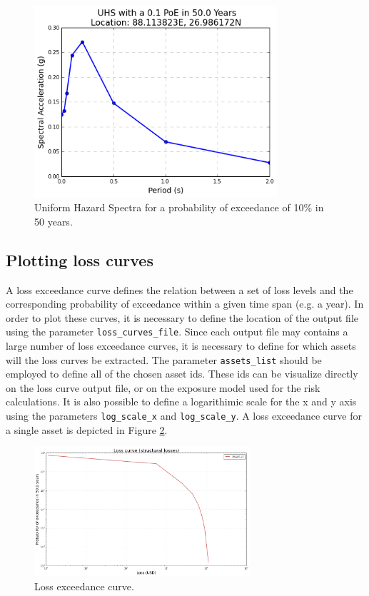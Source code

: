 \begin{figure}[htb]
  \centering
      \includegraphics[width=9cm]{Figures/UHS.png}
  \caption{Uniform Hazard Spectra for a probability of exceedance of 10\% in 50 years.}
  \label{fig:UHS}
\end{figure}

\subsection{Plotting loss curves}
\label{subsec:plot-loss_curves}
A loss exceedance curve defines the relation between a set of loss levels and the corresponding probability of exceedance within a given time span (e.g. a year). In order to plot these curves, it is necessary to define the location of the output file using the parameter \verb=loss_curves_file=. Since each output file may contains a large number of loss exceedance curves, it is necessary to define for which assets will the loss curves be extracted. The parameter \verb=assets_list= should be employed to define all of the chosen asset ids. These ids can be visualize directly on the loss curve output file, or on the exposure model used for the risk calculations. It is also possible to define a logarithimic scale for the x and y axis using the parameters \verb=log_scale_x= and \verb=log_scale_y=. A loss exceedance curve for a single asset is depicted in Figure \ref{fig:loss_curve}.

\begin{figure}[htb]
  \centering
      \includegraphics[width=8cm]{Figures/loss_curve.png}
  \caption{Loss exceedance curve.}
  \label{fig:loss_curve}
\end{figure}